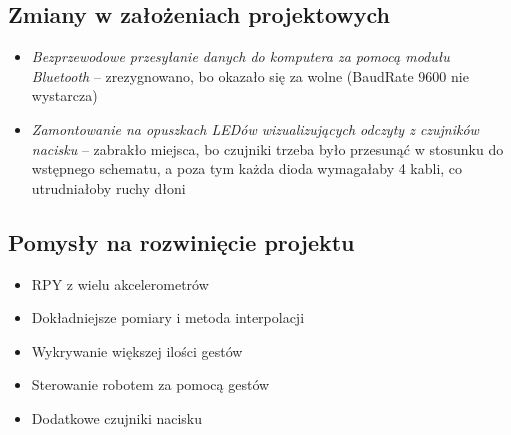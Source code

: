 \documentclass[12pt,a4paper]{article}
\begin{document}
\subsection{Zmiany w założeniach projektowych}
\begin{itemize}
\item \textit{Bezprzewodowe przesyłanie danych do komputera za pomocą modułu Bluetooth} -- zrezygnowano, bo okazało się za wolne (BaudRate 9600 nie wystarcza)
\item \textit{Zamontowanie na opuszkach LEDów wizualizujących odczyty z czujników nacisku} -- zabrakło miejsca, bo czujniki trzeba było przesunąć w stosunku do wstępnego schematu, a poza tym każda dioda wymagałaby 4 kabli, co utrudniałoby ruchy dłoni
\end{itemize}
\subsection{Pomysły na rozwinięcie projektu}
\begin{itemize}
\item RPY z wielu akcelerometrów
\item Dokładniejsze pomiary i metoda interpolacji
\item Wykrywanie większej ilości gestów
\item Sterowanie robotem za pomocą gestów
\item Dodatkowe czujniki nacisku
\end{itemize}
\end{document}

